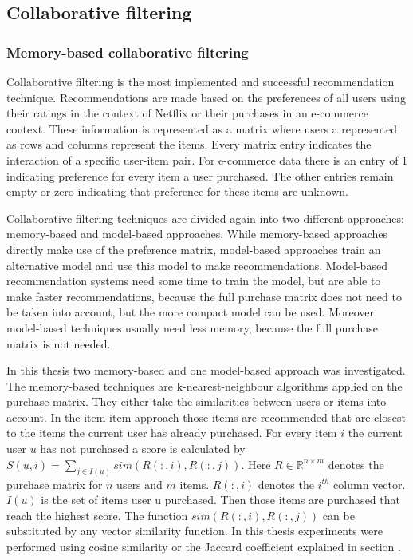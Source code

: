 \documentclass[10pt]{reportMaster}
\begin{document}
\subsection{Collaborative filtering}
\label{rs_cf}
\subsubsection{Memory-based collaborative filtering}
Collaborative filtering is the most implemented and successful recommendation technique. %
Recommendations are made based on the preferences of all users using their ratings in the context of Netflix or their purchases in an e-commerce context.
These information is represented as a matrix where users a represented as rows and columns represent the items.
Every matrix entry indicates the interaction of a specific user-item pair.
For e-commerce data there is an entry of 1 indicating preference for every item a user purchased.
The other entries remain empty or zero indicating that preference for these items are unknown. %

Collaborative filtering techniques are divided again into two different approaches: memory-based and model-based approaches.
While memory-based approaches directly make use of the preference matrix, model-based approaches train an alternative model and use this model to make recommendations.
Model-based recommendation systems need some time to train the model, but are able to make faster recommendations, because the full purchase matrix does not need to be taken into account, but the more compact model can be used.
Moreover model-based techniques usually need less memory, because the full purchase matrix is not needed.

In this thesis two memory-based and one model-based approach was investigated.
The memory-based techniques are k-nearest-neighbour algorithms applied on the purchase matrix.
They either take the similarities between users or items into account. %
In the item-item approach those items are recommended that are closest to the items the current user has already purchased.
For every item $i$ the current user $u$ has not purchased a score is calculated by $S(u,i) = \sum_{j \in I(u)}{sim(R(:,i), R(:,j))}$. Here $R \in \mathds{R}^{n \times m}$ denotes the purchase matrix for $n$ users and $m$ items. $R(:,i)$ denotes the $i^{th}$ column vector. $I(u)$ is the set of items user u purchased.
Then those items are purchased that reach the highest score. %
The function $sim(R(:,i), R(:,j))$ can be substituted by any vector similarity function.
In this thesis experiments were performed using cosine similarity or the Jaccard coefficient explained in section . %
\end{document}
